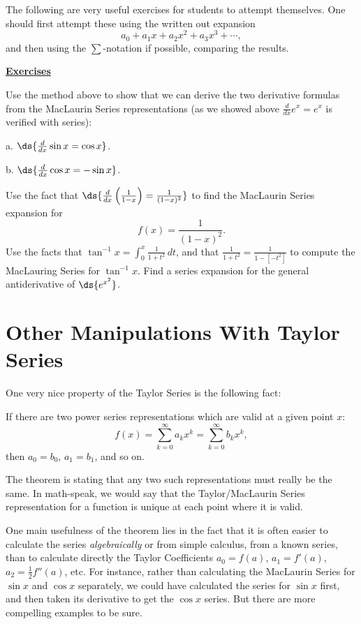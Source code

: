 The following are very useful exercises for students to
attempt themselves.  One should first attempt these
using the written out expansion
$$a_0+a_1x+a_2x^2+a_3x^3+\cdots,$$
and then using the $\sum$-notation if possible, comparing the
results.  

\begin{center}\underline{\bf\Large Exercises}\end{center}
 
\bhw Use the method above to show that we can derive the
two derivative formulas from the MacLaurin Series representations
(as we showed above $\frac{d}{dx}e^x=e^x$ is verified with series):
\begin{description}
\item a. $\ds{\frac{d}{dx}\sin x=\cos x}$.
\item b. $\ds{\frac{d}{dx}\cos x=-\sin x}$.
\end{description}
\ehw
\bhw
 Use the fact that $\ds{\frac{d}{dx}\left(\frac1{1-x}\right)
=\frac1{(1-x)^2}}$ 
to find the MacLaurin Series expansion for
$$f(x)=\frac1{(1-x)^2}.$$
\ehw
\bhw Use the facts that $\tan^{-1}x=\int_0^x\frac{1}{1+t^2}\,dt$,
and that $\frac1{1+t^2}=\frac1{1-[-t^2]}$ to compute the MacLauring
Series for $\tan^{-1}x$.
\ehw
\bhw Find a series expansion for the general antiderivative
     of $\ds{e^{x^2}}$.

\ehw

\newpage
\section{Other Manipulations With Taylor Series\label{OtherManipulations}}
\bigskip

One very nice property of the Taylor Series is the following fact:

\begin{theorem}If there are two power series
representations which are valid at a given point $x$:
$$f(x)=\sum_{k=0}^\infty a_k x^k =\sum_{k=0}^\infty b_kx^k,$$
then $a_0=b_0$, $a_1=b_1$, and so on. 
\end{theorem}

The theorem is stating that any two such representations must
really be the same.  In math-speak, we would say that the
Taylor/MacLaurin Series representation for a function
is unique at each point where it is valid.

One main usefulness of the theorem lies in the fact that
it is often easier to calculate the series {\it algebraically}
or from simple calculus, from a known series, than to 
calculate directly the Taylor Coefficients $a_0=f(a)$, $a_1=f'(a)$,
$a_2=\frac12f''(a)$, etc.  For instance, rather than calculating
the MacLaurin Series for $\sin x$ and $\cos x$ separately,
we could have calculated the series for $\sin x$ first, and
then taken its derivative to get the $\cos x$ series.
But there are more compelling examples to be sure.

